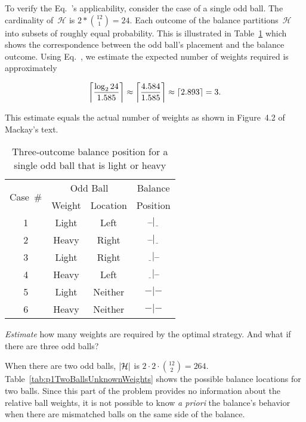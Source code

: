   To verify the Eq.~'s applicability, consider the case of a single odd ball.  The cardinality of~$\mathcal{H}$ is ${2 * \binom{12}{1} = 24}$. Each outcome of the balance partitions~$\mathcal{H}$ into subsets of roughly equal probability. This is illustrated in Table~\ref{tab:p1OneBallTable} which shows the correspondence between the odd ball's placement and the balance outcome. Using Eq.~, we estimate the expected number of weights required is approximately

  \[ \ceil*{\frac{\log_{2}24}{1.585}} \approx \ceil*{\frac{4.584}{1.585}} \approx \ceil{2.893} = 3 \text{.} \]

  \noindent
  This estimate equals the actual number of weights as shown in Figure~4.2 of Mackay's text.

  \begin{table}[H]
    \centering
    \caption{Three-outcome balance position for a \\single odd ball that is light or heavy}\label{tab:p1OneBallTable}
    \begin{tabular}{|c||c|c||c|}
      \hline
      \multirow{2}{*}{Case~\#} &  \multicolumn{2}{c||}{Odd Ball} & Balance\\\cline{2-3}
      &  Weight  &  Location &  Position  \\ \hline\hline
      1   &  Light   &  Left     &  $\bar{~}\bar{~}|\underline{~~}$ \\ \hline
      2   &  Heavy   &  Right    &  $\bar{~}\bar{~}|\underline{~~}$ \\ \hline\hline
      3   &  Light   &  Right    &  $\underline{~~}|\bar{~}\bar{~}$ \\ \hline
      4   &  Heavy   &  Left     &  $\underline{~~}|\bar{~}\bar{~}$ \\ \hline\hline
      5   &  Light   &  Neither  &  $-|-$ \\ \hline
      6   &  Heavy   &  Neither  &  $-|-$ \\ \hline
    \end{tabular}
  \end{table}


\begin{subproblem}
  \textit{Estimate} how many weights are required by the optimal strategy.  And what if there are three odd balls?
\end{subproblem}

  When there are two odd balls, $\abs{\mathcal{H}}$ is ${2\cdot2\cdot\binom{12}{2} = 264}$. Table~\ref{tab:p1TwoBallsUnknownWeights} shows the possible balance locations for two balls.  Since this part of the problem provides no information about the relative ball weights, it is not possible to know \textit{a priori} the balance's behavior when there are mismatched balls on the same side of the balance.


